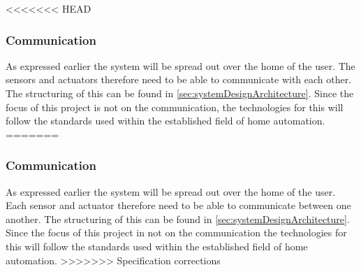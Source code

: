 <<<<<<< HEAD
\subsubsection{Communication}
As expressed earlier the system will be spread out over the home of the user. The sensors and actuators therefore need to be able to communicate with each other. The structuring of this can be found in \cref{sec:systemDesignArchitecture}. Since the focus of this project is not on the communication, the technologies for this will follow the standards used within the established field of home automation.
=======
\subsubsection{Communication}
As expressed earlier the system will be spread out over the home of the user. Each sensor and actuator therefore need to be able to communicate between one another. The structuring of this can be found in \cref{sec:systemDesignArchitecture}. Since the focus of this project in not on the communication the technologies for this will follow the standards used within the established field of home automation.
>>>>>>> Specification corrections
